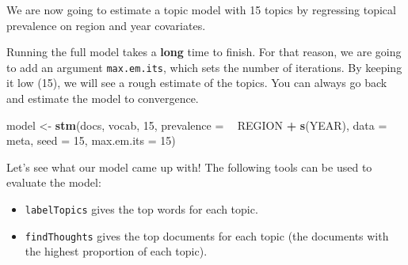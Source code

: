 \documentclass[
]{book}
\newenvironment{Shaded}{\begin{snugshade}}{\end{snugshade}}
\newcommand{\DataTypeTok}[1]{\textcolor[rgb]{0.13,0.29,0.53}{#1}}
\newcommand{\DecValTok}[1]{\textcolor[rgb]{0.00,0.00,0.81}{#1}}
\newcommand{\KeywordTok}[1]{\textcolor[rgb]{0.13,0.29,0.53}{\textbf{#1}}}
\newcommand{\NormalTok}[1]{#1}
\newcommand{\OperatorTok}[1]{\textcolor[rgb]{0.81,0.36,0.00}{\textbf{#1}}}
\newcommand{\StringTok}[1]{\textcolor[rgb]{0.31,0.60,0.02}{#1}}
\providecommand{\tightlist}{%
  \setlength{\itemsep}{0pt}\setlength{\parskip}{0pt}}
\begin{document}
We are now going to estimate a topic model with 15 topics by regressing topical prevalence on region and year covariates.

Running the full model takes a \textbf{long} time to finish. For that reason, we are going to add an argument \texttt{max.em.its}, which sets the number of iterations. By keeping it low (15), we will see a rough estimate of the topics. You can always go back and estimate the model to convergence.

\begin{Shaded}
\begin{Highlighting}[]
\NormalTok{model <-}\StringTok{ }\KeywordTok{stm}\NormalTok{(docs, vocab, }\DecValTok{15}\NormalTok{, }\DataTypeTok{prevalence =} \OperatorTok{~}\StringTok{ }\NormalTok{REGION }\OperatorTok{+}\StringTok{ }\KeywordTok{s}\NormalTok{(YEAR), }\DataTypeTok{data =}\NormalTok{ meta, }\DataTypeTok{seed =} \DecValTok{15}\NormalTok{, }\DataTypeTok{max.em.its =} \DecValTok{15}\NormalTok{)}
\end{Highlighting}
\end{Shaded}

Let's see what our model came up with! The following tools can be used to evaluate the model:

\begin{itemize}
\tightlist
\item
  \texttt{labelTopics} gives the top words for each topic.
\item
  \texttt{findThoughts} gives the top documents for each topic (the documents with the highest proportion of each topic).
\end{itemize}
\end{document}
